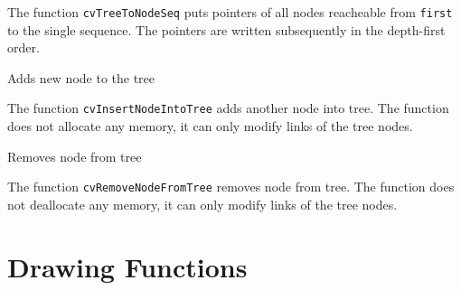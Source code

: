 The function \texttt{cvTreeToNodeSeq} puts pointers of all nodes reacheable from \texttt{first} to the single sequence. The pointers are written subsequently in the depth-first order.

\label{InsertNodeIntoTree}

Adds new node to the tree


\begin{description}
\end{description}

The function \texttt{cvInsertNodeIntoTree} adds another node into tree. The function does not allocate any memory, it can only modify links of the tree nodes.

\label{RemoveNodeFromTree}

Removes node from tree


\begin{description}
\end{description}

The function \texttt{cvRemoveNodeFromTree} removes node from tree. The function does not deallocate any memory, it can only modify links of the tree nodes.

\section{Drawing Functions}

